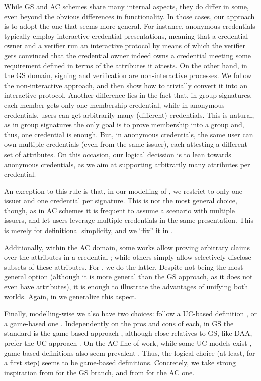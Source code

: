 While GS and AC schemes share many internal aspects, they do differ in some,
even beyond the obvious differences in functionality. In those cases, our
approach is to adopt the one that seems more general.
%
For instance,
anonymous credentials typically employ interactive credential presentations,
meaning that a credential owner and a verifier run an interactive
protocol by means of which the verifier gets convinced that the credential owner
indeed owns a credential meeting some requirement defined in terms of the
attributes it attests. On the other hand, in the GS domain, signing and
verification are non-interactive processes. We follow the non-interactive
approach, and then show how to trivially convert it into an interactive
protocol.
%
Another difference lies in the fact that, in group signatures, each member gets
only one membership credential, while in anonymous credentials, users can get
arbitrarily many (different) credentials. This is natural, as in group
signatures the only goal is to prove membership into a group and, thus, one
credential is enough. But, in anonymous credentials, the same user can own
multiple credentials (even from the same issuer), each attesting a different
set of attributes. On this occasion, our logical decission is to lean towards
anonymous credentials, as we aim at supporting arbitrarily many attributes per
credential.

An exception to this rule is that, in our modelling of \GSAC, we restrict to
only one issuer and one credential per signature. This is not the most general
choice, though, as in AC schemes it is frequent to assume a scenario with
multiple issuers, and let users leverage multiple credentials in the same
presentation. This is merely for definitional simplicity, and we ``fix'' it
in \UAS.

Additionally, within the AC domain, some works allow proving arbitrary claims
over the attributes in a credential \needcite; while others simply allow
selectively disclose subsets of these attributes. For \GSAC, we do the latter.
Despite not being the most general option (although it is more general than the
GS approach, as it does not even have attributes), it is enough to illustrate
the advantages of unifying both worlds. Again, in \UAS we generalize this
aspect.

Finally, modelling-wise we also have two choices: follow a UC-based definition
\needcite, or a game-based one \needcite. Independently on the pros and cons of
each, in GS the standard is the game-based approach
\cite{bmw03,bsz05,bcc+16,kty04,ky05}, although close relatives to GS, like DAA, prefer the
UC approach \needcite. On the AC line of work, while some UC models exist
\needcite, game-based definitions also seem prevalent \cite{fhs19} \needcite.
Thus, the logical choice (at least, for a first step) seems to be game-based
definitions. Concretely, we take strong inspiration from \cite{bsz05} for the
GS branch, and from \cite{fhs19} for the AC one.

